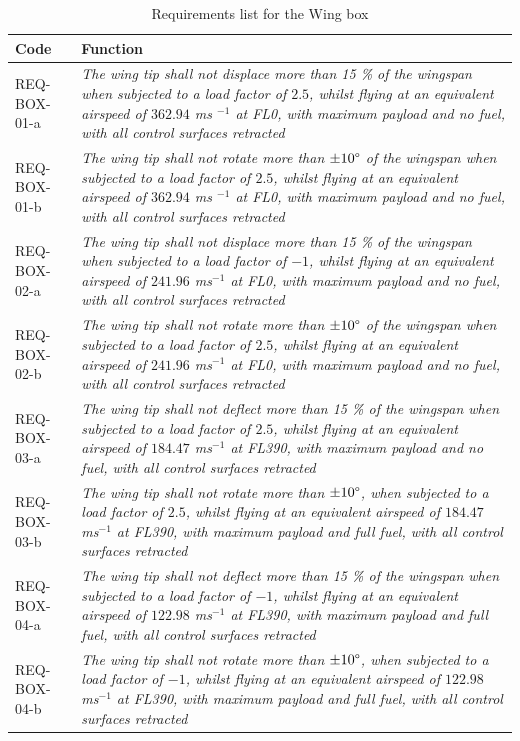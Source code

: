 \begin{longtable}[H]{|>{\columncolor{blue!15}}p{} |p{}|}
    \caption{Requirements list for the Wing box}
    \label{tab:req_list_wingbox}
    \endfirsthead
        \hline
        \textbf{Code} & \cellcolor{blue!15}\textbf{Function} \\
        \hline

         REQ-BOX-01-a & \textit{The wing tip shall not displace more than 15 \% of the wingspan when subjected to a load factor of $2.5$, whilst flying at an equivalent airspeed of $362.94$ ms $^{-1}$ at FL0, with maximum payload and no fuel, with all control surfaces retracted}\\
        \hline
         REQ-BOX-01-b & \textit{The wing tip shall not rotate more than $\pm 10 \degree $ of the wingspan when subjected to a load factor of $2.5$, whilst flying at an equivalent airspeed of $362.94$ ms $^{-1}$ at FL0, with maximum payload and no fuel, with all control surfaces retracted}\\
        \hline
        REQ-BOX-02-a & \textit{The wing tip shall not displace more than 15 \% of the wingspan when subjected to a load factor of $-1$, whilst flying at an equivalent airspeed of $241.96$ ms$^{-1}$ at FL0, with maximum payload and no fuel, with all control surfaces retracted}\\
        \hline
        REQ-BOX-02-b & \textit{The wing tip shall not rotate more than $\pm 10 \degree $ of the wingspan when subjected to a load factor of $2.5$, whilst flying at an equivalent airspeed of $241.96$ ms$^{-1}$ at FL0, with maximum payload and no fuel, with all control surfaces retracted}\\
        \hline
        REQ-BOX-03-a & \textit{The wing tip shall not deflect more than 15 \% of the wingspan when subjected to a load factor of $2.5$, whilst flying at an equivalent airspeed of $184.47$ ms$^{-1}$ at FL390, with maximum payload and no fuel, with all control surfaces retracted}\\
        \hline
        REQ-BOX-03-b & \textit{The wing tip shall not rotate more than $\pm 10 \degree $, when subjected to a load factor of $2.5$, whilst flying at an equivalent airspeed of $184.47$ ms$^{-1}$ at FL390, with maximum payload and full fuel, with all control surfaces retracted}\\
        \hline
        REQ-BOX-04-a & \textit{The wing tip shall not deflect more than 15 \% of the wingspan when subjected to a load factor of $-1$, whilst flying at an equivalent airspeed of $122.98$ ms$^{-1}$ at FL390, with maximum payload and full fuel, with all control surfaces retracted}\\
        \hline
        REQ-BOX-04-b & \textit{The wing tip shall not rotate more than $\pm 10 \degree $, when subjected to a load factor of $-1$, whilst flying at an equivalent airspeed of $122.98$ ms$^{-1}$ at FL390, with maximum payload and full fuel, with all control surfaces retracted}\\
        \hline
\end{longtable}

